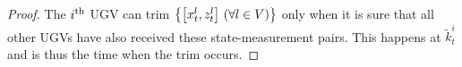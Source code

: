 	\begin{proof}
		The $i^\text{th}$ UGV can trim $\left\lbrace\left[x^l_t,z^l_t\right] \,(\forall l\in V)\right\rbrace$ only when it is sure that all other UGVs have also received these state-measurement pairs.
		This happens at $\tilde{k}^i_t$ and is thus the time when the trim occurs. 
		
		
		
	\end{proof}
	
	
%	
	
